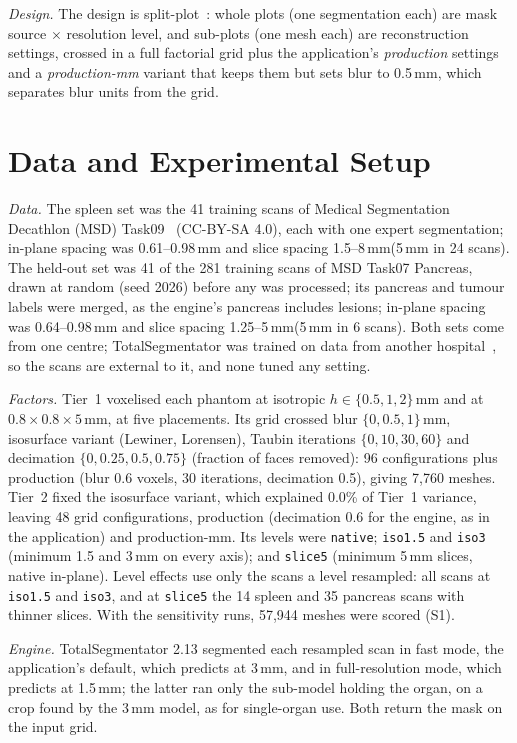 \documentclass[conference]{IEEEtran}
\newcommand{\lvl}[1]{\texttt{#1}}
\newcommand{\mm}{\,mm\xspace}
\begin{document}
\emph{Design.} The design is split-plot~\cite{montgomery2017doe}: whole plots (one segmentation each) are mask source $\times$ resolution level, and sub-plots (one mesh each) are reconstruction settings, crossed in a full factorial grid plus the application's \emph{production} settings and a \emph{production-mm} variant that keeps them but sets blur to 0.5\mm, which separates blur units from the grid.

\section{Data and Experimental Setup}
\emph{Data.} The spleen set was the 41 training scans of Medical Segmentation Decathlon (MSD) Task09~\cite{antonelli2022msd} (CC-BY-SA 4.0), each with one expert segmentation; in-plane spacing was 0.61--0.98\mm and slice spacing 1.5--8\mm (5\mm in 24 scans). The held-out set was 41 of the 281 training scans of MSD Task07 Pancreas, drawn at random (seed 2026) before any was processed; its pancreas and tumour labels were merged, as the engine's pancreas includes lesions; in-plane spacing was 0.64--0.98\mm and slice spacing 1.25--5\mm (5\mm in 6 scans). Both sets come from one centre; TotalSegmentator was trained on data from another hospital~\cite{wasserthal2023totalsegmentator}, so the scans are external to it, and none tuned any setting.

\emph{Factors.} Tier~1 voxelised each phantom at isotropic $h\in\{0.5,1,2\}$\mm and at $0.8\times0.8\times5$\mm, at five placements. Its grid crossed blur $\{0,0.5,1\}$\mm, isosurface variant (Lewiner, Lorensen), Taubin iterations $\{0,10,30,60\}$ and decimation $\{0,0.25,0.5,0.75\}$ (fraction of faces removed): 96 configurations plus production (blur 0.6 voxels, 30 iterations, decimation 0.5), giving 7{,}760 meshes. Tier~2 fixed the isosurface variant, which explained 0.0\% of Tier~1 variance, leaving 48 grid configurations, production (decimation 0.6 for the engine, as in the application) and production-mm. Its levels were \lvl{native}; \lvl{iso1.5} and \lvl{iso3} (minimum 1.5 and 3\mm on every axis); and \lvl{slice5} (minimum 5\mm slices, native in-plane). Level effects use only the scans a level resampled: all scans at \lvl{iso1.5} and \lvl{iso3}, and at \lvl{slice5} the 14 spleen and 35 pancreas scans with thinner slices. With the sensitivity runs, 57{,}944 meshes were scored (S1).

\emph{Engine.} TotalSegmentator 2.13 segmented each resampled scan in fast mode, the application's default, which predicts at 3\mm, and in full-resolution mode, which predicts at 1.5\mm; the latter ran only the sub-model holding the organ, on a crop found by the 3\mm model, as for single-organ use. Both return the mask on the input grid.
\end{document}
